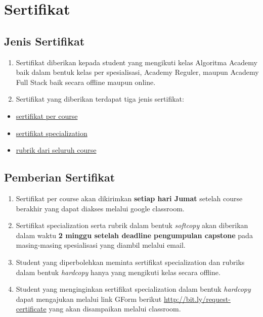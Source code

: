 \documentclass[
]{book}
\providecommand{\tightlist}{%
  \setlength{\itemsep}{0pt}\setlength{\parskip}{0pt}}
\begin{document}
\hypertarget{sertifikat}{%
\section{Sertifikat}\label{sertifikat}}

\hypertarget{jenis-sertifikat}{%
\subsection{Jenis Sertifikat}\label{jenis-sertifikat}}

\begin{enumerate}
\def\labelenumi{\arabic{enumi}.}
\tightlist
\item
  Sertifikat diberikan kepada student yang mengikuti kelas Algoritma Academy baik dalam bentuk kelas per spesialisasi, Academy Reguler, maupun Academy Full Stack baik secara offline maupun online.
\item
  Sertifikat yang diberikan terdapat tiga jenis sertifikat:
\end{enumerate}

\begin{itemize}
\tightlist
\item
  \href{https://drive.google.com/file/d/1TrBBxXDQkui3kyf-ZV6I_X5nIl3GVPWk/view?usp=sharing}{sertifikat per course}
\item
  \href{https://drive.google.com/file/d/1YKMvF6K_t-k412lpVTsfU7CQ2ElPbDiw/view?usp=sharing}{sertifikat specialization}
\item
  \href{https://drive.google.com/file/d/1iXF1Ui3pOd0Iz2krhH3U-5BTjSCdUQ5l/view?usp=sharing}{rubrik dari seluruh course}
\end{itemize}

\hypertarget{pemberian-sertifikat}{%
\subsection{Pemberian Sertifikat}\label{pemberian-sertifikat}}

\begin{enumerate}
\def\labelenumi{\arabic{enumi}.}
\tightlist
\item
  Sertifikat per course akan dikirimkan \textbf{setiap hari Jumat} setelah course berakhir yang dapat diakses melalui google classroom.
\item
  Sertifikat specialization serta rubrik dalam bentuk \emph{softcopy} akan diberikan dalam waktu \textbf{2 minggu setelah deadline pengumpulan capstone} pada masing-masing spesialisasi yang diambil melalui email.
\item
  Student yang diperbolehkan meminta sertifikat specialization dan rubriks dalam bentuk \emph{hardcopy} hanya yang mengikuti kelas secara offline.\\
\item
  Student yang menginginkan sertifikat specialization dalam bentuk \emph{hardcopy} dapat mengajukan melalui link GForm berikut \url{http://bit.ly/request-certificate} yang akan disampaikan melalui classroom.
\end{enumerate}
\end{document}
